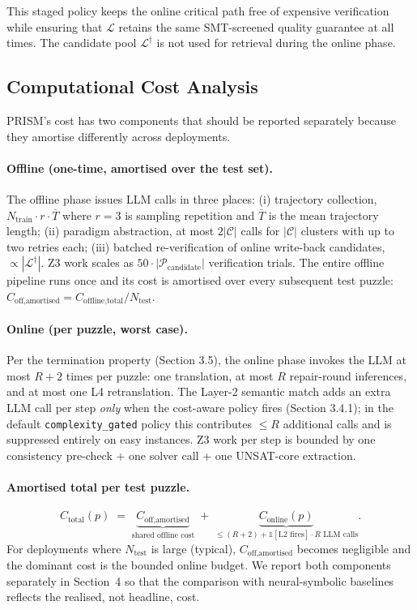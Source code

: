 This staged policy keeps the online critical path free of expensive verification while ensuring that $\mathcal{L}$ retains the same SMT-screened quality guarantee at all times. The candidate pool $\mathcal{L}^{\dagger}$ is not used for retrieval during the online phase.

\subsection{Computational Cost Analysis}
\label{sec:cost}

PRISM's cost has two components that should be reported separately because they amortise differently across deployments.

\paragraph{Offline (one-time, amortised over the test set).}
The offline phase issues LLM calls in three places: (i) trajectory collection, $N_{\text{train}} \cdot r \cdot \bar{T}$ where $r{=}3$ is sampling repetition and $\bar{T}$ is the mean trajectory length; (ii) paradigm abstraction, at most $2|\mathcal{C}|$ calls for $|\mathcal{C}|$ clusters with up to two retries each; (iii) batched re-verification of online write-back candidates, $\propto |\mathcal{L}^{\dagger}|$. Z3 work scales as $50 \cdot |\mathcal{P}_{\text{candidate}}|$ verification trials. The entire offline pipeline runs once and its cost is amortised over every subsequent test puzzle: $C_{\text{off,amortised}} = C_{\text{offline,total}} / N_{\text{test}}$.

\paragraph{Online (per puzzle, worst case).}
Per the termination property (Section 3.5), the online phase invokes the LLM at most $R + 2$ times per puzzle: one translation, at most $R$ repair-round inferences, and at most one L4 retranslation. The Layer-2 semantic match adds an extra LLM call per step \emph{only} when the cost-aware policy fires (Section 3.4.1); in the default \texttt{complexity\_gated} policy this contributes $\leq R$ additional calls and is suppressed entirely on easy instances. Z3 work per step is bounded by one consistency pre-check + one solver call + one UNSAT-core extraction.

\paragraph{Amortised total per test puzzle.}
$$
C_{\text{total}}(p) \;=\; \underbrace{C_{\text{off,amortised}}}_{\text{shared offline cost}} \;+\; \underbrace{C_{\text{online}}(p)}_{\le (R{+}2) + \mathbb{1}[\text{L2 fires}] \cdot R \text{ LLM calls}}.
$$
For deployments where $N_{\text{test}}$ is large (typical), $C_{\text{off,amortised}}$ becomes negligible and the dominant cost is the bounded online budget. We report both components separately in Section~4 so that the comparison with neural-symbolic baselines reflects the realised, not headline, cost.
